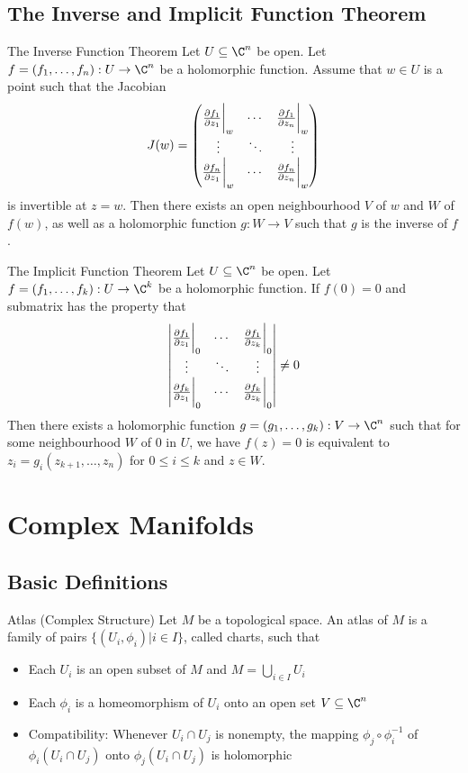 \documentclass[a4paper]{article}
\begin{document}
\subsection{The Inverse and Implicit Function Theorem}
\begin{thm}{The Inverse Function Theorem}{} Let $U\subseteq\C^n$ be open. Let $f=(f_1,\dots,f_n):U\to\C^n$ be a holomorphic function. Assume that $w\in U$ is a point such that the Jacobian $$J(w)=\begin{pmatrix}
\frac{\partial f_1}{\partial z_1}\bigg{|}_{w} & \cdots & \frac{\partial f_1}{\partial z_n}\bigg{|}_{w}\\
\vdots & \ddots & \vdots\\
\frac{\partial f_n}{\partial z_1}\bigg{|}_{w} & \cdots & \frac{\partial f_n}{\partial z_n}\bigg{|}_{w}
\end{pmatrix}$$ is invertible at $z=w$. Then there exists an open neighbourhood $V$ of $w$ and $W$ of $f(w)$, as well as a holomorphic function $g:W\to V$ such that $g$ is the inverse of $f$. 
\end{thm}

\begin{thm}{The Implicit Function Theorem}{} Let $U\subseteq\C^n$ be open. Let $f=(f_1,\dots,f_k):U\to\C^k$ be a holomorphic function. If $f(0)=0$ and submatrix has the property that $$\begin{vmatrix}
\frac{\partial f_1}{\partial z_1}\bigg{|}_{0} & \cdots & \frac{\partial f_1}{\partial z_k}\bigg{|}_{0}\\
\vdots & \ddots & \vdots\\
\frac{\partial f_k}{\partial z_1}\bigg{|}_{0} & \cdots & \frac{\partial f_k}{\partial z_k}\bigg{|}_{0}
\end{vmatrix}\neq 0$$ Then there exists a holomorphic function $g=(g_1,\dots,g_k):V\to\C^n$ such that for some neighbourhood $W$ of $0$ in $U$, we have $f(z)=0$ is equivalent to $z_i=g_i(z_{k+1},\dots,z_n)$ for $0\leq i\leq k$ and $z\in W$. 
\end{thm}

\pagebreak
\section{Complex Manifolds}
\subsection{Basic Definitions}
\begin{defn}{Atlas (Complex Structure)}{} Let $M$ be a topological space. An atlas of $M$ is a family of pairs $\{(U_i,\phi_i)|i\in I\}$, called charts, such that 
\begin{itemize}
\item Each $U_i$ is an open subset of $M$ and $M=\bigcup_{i\in I}U_i$
\item Each $\phi_i$ is a homeomorphism of $U_i$ onto an open set $V\subseteq\C^n$
\item Compatibility: Whenever $U_i\cap U_j$ is nonempty, the mapping $\phi_j\circ\phi_i^{-1}$ of $\phi_i(U_i\cap U_j)$ onto $\phi_j(U_i\cap U_j)$ is holomorphic
\end{itemize}
\end{defn}
\end{document}
